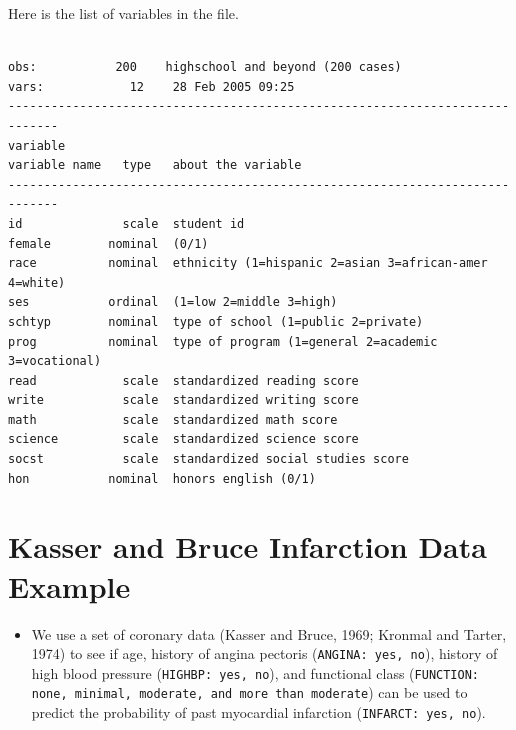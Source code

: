 \documentclass[a4paper,12pt]{article}
\begin{document}
Here is the list of variables in the file.
\begin{verbatim}

obs:           200    highschool and beyond (200 cases)
vars:            12    28 Feb 2005 09:25
-----------------------------------------------------------------------------
variable
variable name   type   about the variable
-----------------------------------------------------------------------------
id              scale  student id
female        nominal  (0/1)
race          nominal  ethnicity (1=hispanic 2=asian 3=african-amer 4=white)
ses           ordinal  (1=low 2=middle 3=high)
schtyp        nominal  type of school (1=public 2=private)
prog          nominal  type of program (1=general 2=academic 3=vocational)
read            scale  standardized reading score
write           scale  standardized writing score
math            scale  standardized math score
science         scale  standardized science score
socst           scale  standardized social studies score
hon           nominal  honors english (0/1)
\end{verbatim}
\newpage




\section*{Kasser and Bruce Infarction Data Example}
\begin{itemize}
	\item We use a set of coronary data (Kasser and Bruce, 1969;
	Kronmal and Tarter, 1974) to see if age, history of angina pectoris (\texttt{ANGINA:
	yes, no}), history of high blood pressure (\texttt{HIGHBP: yes, no}), and functional class
	(\texttt{FUNCTION: none, minimal, moderate, and more than moderate}) can be used to
	predict the probability of past myocardial infarction (\texttt{INFARCT: yes, no}).
\end{itemize}
\end{document}
